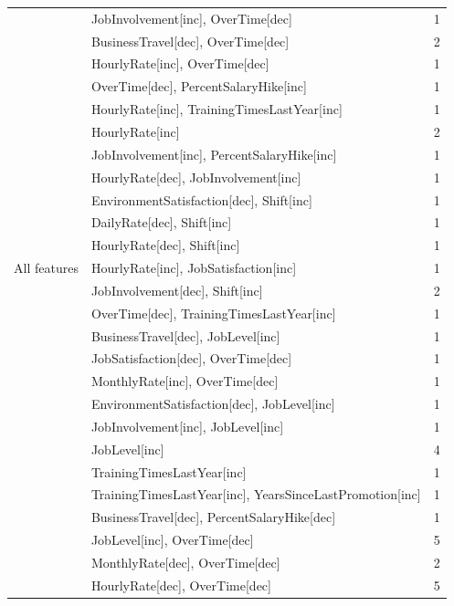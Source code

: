 \documentclass[a4paper,fleqn]{cas-sc}
\begin{document}
{\begin{longtable}{llr}
 & JobInvolvement[inc], OverTime[dec]                 & 1 \\
 & BusinessTravel[dec], OverTime[dec]                 & 2 \\
 & HourlyRate[inc], OverTime[dec]                     & 1 \\
 & OverTime[dec], PercentSalaryHike[inc]               & 1 \\
 & HourlyRate[inc], TrainingTimesLastYear[inc]        & 1 \\
 & HourlyRate[inc]                                    & 2 \\
 & JobInvolvement[inc], PercentSalaryHike[inc]        & 1 \\
 & HourlyRate[dec], JobInvolvement[inc]               & 1 \\
 & EnvironmentSatisfaction[dec], Shift[inc]           & 1 \\
 & DailyRate[dec], Shift[inc]                         & 1 \\
 & HourlyRate[dec], Shift[inc]                        & 1 \\
 All features & HourlyRate[inc], JobSatisfaction[inc]              & 1 \\
 & JobInvolvement[dec], Shift[inc]                    & 2 \\
 & OverTime[dec], TrainingTimesLastYear[inc]          & 1 \\
 & BusinessTravel[dec], JobLevel[inc]                 & 1 \\
 & JobSatisfaction[dec], OverTime[dec]                & 1 \\
 & MonthlyRate[inc], OverTime[dec]                    & 1 \\
 & EnvironmentSatisfaction[dec], JobLevel[inc]        & 1 \\
 & JobInvolvement[inc], JobLevel[inc]                 & 1 \\
 & JobLevel[inc]                                      & 4 \\
 & TrainingTimesLastYear[inc]                         & 1 \\
 & TrainingTimesLastYear[inc], YearsSinceLastPromotion[inc] & 1 \\
 & BusinessTravel[dec], PercentSalaryHike[dec]        & 1 \\
 & JobLevel[inc], OverTime[dec]                       & 5 \\
 & MonthlyRate[dec], OverTime[dec]                    & 2 \\
 & HourlyRate[dec], OverTime[dec]                     & 5 \\

\end{longtable}}
\end{document}
